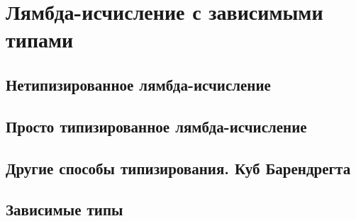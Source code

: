 \section{Лямбда-исчисление с зависимыми типами}

\subsection{Нетипизированное лямбда-исчисление}

\subsection{Просто типизированное лямбда-исчисление}

\subsection{Другие способы типизирования. Куб Барендрегта}

\subsection{Зависимые типы}
